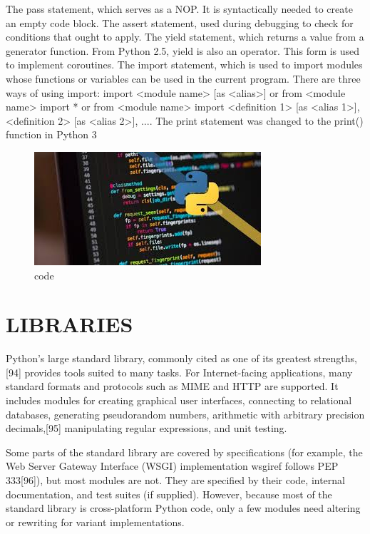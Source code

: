 \documentclass[conference]{IEEEtran} %
\begin{document}
    The pass statement, which serves as a NOP. It is syntactically needed to create an empty code block.
    The assert statement, used during debugging to check for conditions that ought to apply.
    The yield statement, which returns a value from a generator function. From Python 2.5, yield is also an operator. This form is used to implement coroutines.
    The import statement, which is used to import modules whose functions or variables can be used in the current program. There are three ways of using import: import <module name> [as <alias>] or from <module name> import * or from <module name> import <definition 1> [as <alias 1>], <definition 2> [as <alias 2>], ....
    The print statement was changed to the print() function in Python 3

\begin{figure}[H]
        \centering
                \includegraphics[width=\linewidth]{python1}
                \caption{code} 
                \label{python}
    \end{figure}


\section{LIBRARIES}
Python's large standard library, commonly cited as one of its greatest strengths,[94] provides tools suited to many tasks. For Internet-facing applications, many standard formats and protocols such as MIME and HTTP are supported. It includes modules for creating graphical user interfaces, connecting to relational databases, generating pseudorandom numbers, arithmetic with arbitrary precision decimals,[95] manipulating regular expressions, and unit testing.

Some parts of the standard library are covered by specifications (for example, the Web Server Gateway Interface (WSGI) implementation wsgiref follows PEP 333[96]), but most modules are not. They are specified by their code, internal documentation, and test suites (if supplied). However, because most of the standard library is cross-platform Python code, only a few modules need altering or rewriting for variant implementations.
\end{document}
